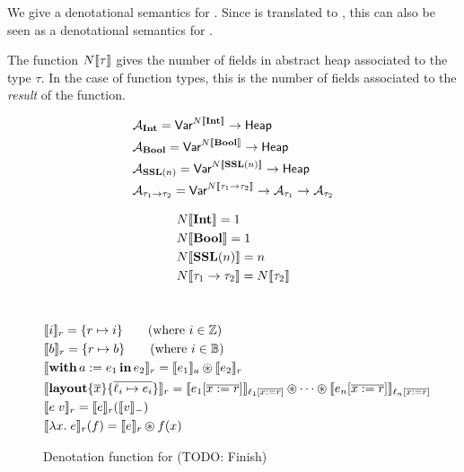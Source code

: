 We give a denotational semantics for \PikaCore. Since \Pika{} is translated to \PikaCore, this can
also be seen as a denotational semantics for \Pika.

The function $N\llbracket \tau \rrbracket$ gives the number of fields in abstract
heap associated to the type $\tau$. In the case of function types, this
is the number of fields associated to the \textit{result} of the function.

\begin{align*}
  &\mathcal{A}_{\textbf{Int}} = \textsf{Var}^{N\llbracket \textbf{Int} \rrbracket} \rightarrow \textsf{Heap}
  \\
  &\mathcal{A}_{\textbf{Bool}} = \textsf{Var}^{N\llbracket \textbf{Bool} \rrbracket} \rightarrow \textsf{Heap}
  \\
  &\mathcal{A}_{\textbf{SSL}(n)} = \textsf{Var}^{N\llbracket \textbf{SSL}(n) \rrbracket} \rightarrow \textsf{Heap}
  \\
  &\mathcal{A}_{\tau_1 \rightarrow \tau_2} = \textsf{Var}^{N\llbracket \tau_1 \rightarrow \tau_2 \rrbracket} \rightarrow \mathcal{A}_{\tau_1} \rightarrow \mathcal{A}_{\tau_2}
\end{align*}

\begin{align*}
  &N\llbracket \textbf{Int} \rrbracket = 1
  \\
  &N\llbracket \textbf{Bool} \rrbracket = 1
  \\
  &N\llbracket \textbf{SSL}(n) \rrbracket = n
  \\
  &N\llbracket \tau_1 \rightarrow \tau_2 \rrbracket = N\llbracket \tau_2 \rrbracket
\end{align*}
\\

\begin{figure}
\begin{center}
\end{center}
\begin{align*}
  &\sem{i}_r = \{ r \mapsto i \}\tag{where $i \in \mathbb{Z}$}
  \\
  &\sem{b}_r = \{ r \mapsto b \}\tag{where $i \in \mathbb{B}$}
  \\
  &\sem{\withIn{a := e_1} e_2}_r = \sem{e_1}_a \osep \sem{e_2}_r
  \\
  &\sem{\sslmath{\overline{x}}{\overline{\ell_i \mapsto e_i}}}_r =
    \sem{e_1[\overline{x := r}]}_{\ell_1[\overline{x := r}]} \osep \cdots \osep \sem{e_n[\overline{x := r}]}_{\ell_n[\overline{x := r}]}
  \\
  &\sem{e\; v}_r =
      \sem{e}_r(\sem{v}_{-})
  \\
  &\sem{\lambda x.\; e}_r(f)
      = \sem{e}_r \osep f(x)
\end{align*}
  \caption{Denotation function for \PikaCore ({\color{red}TODO}: Finish)}
\end{figure}

